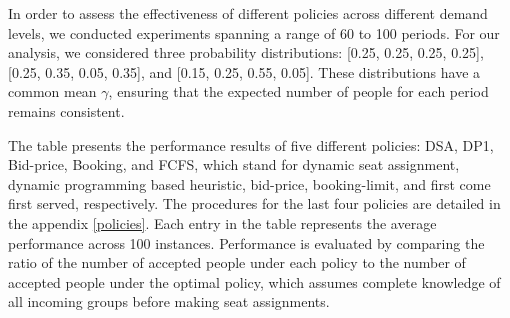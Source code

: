 In order to assess the effectiveness of different policies across different demand levels, we conducted experiments spanning a range of 60 to 100 periods. For our analysis, we considered three probability distributions: [0.25, 0.25, 0.25, 0.25], [0.25, 0.35, 0.05, 0.35], and [0.15, 0.25, 0.55, 0.05]. These distributions have a common mean $\gamma$, ensuring that the expected number of people for each period remains consistent.

The table presents the performance results of five different policies: DSA, DP1, Bid-price, Booking, and FCFS, which stand for dynamic seat assignment, dynamic programming based heuristic, bid-price, booking-limit, and first come first served, respectively. The procedures for the last four policies are detailed in the appendix \ref{policies}. Each entry in the table represents the average performance across 100 instances. Performance is evaluated by comparing the ratio of the number of accepted people under each policy to the number of accepted people under the optimal policy, which assumes complete knowledge of all incoming groups before making seat assignments.


